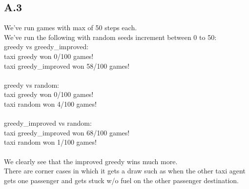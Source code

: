 \documentclass[12pt]{article}
\begin{document}
\subsection*{A.3}
We've run games with max of 50 steps each.\\
We've run the following with random seeds increment between 0 to 50:\\
greedy vs greedy\_improved:\\
taxi greedy won 0/100 games!\\
taxi greedy\_improved won 58/100 games!\\
\\
greedy vs random:\\
taxi greedy won 0/100 games!\\
taxi random won 4/100 games!\\
\\
greedy\_improved vs random:\\
taxi greedy\_improved won 68/100 games!\\
taxi random won 1/100 games!\\
\\
We clearly see that the improved greedy wins much more.\\
There are corner cases in which it gets a draw such as when the other taxi agent gets one passenger and gets stuck w/o fuel on the other passenger destination.

\begin{comment}
 
\end{comment}
\end{document}
